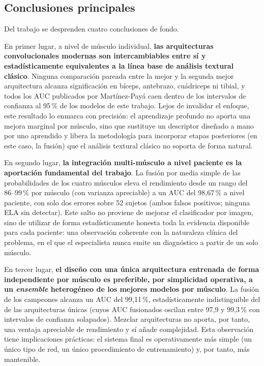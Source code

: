 \documentclass[12pt]{extarticle}
\numberwithin{equation}{section}
\begin{document}
\begin{refsection}
\subsection{Conclusiones principales}\label{subsec:conc-principales}

Del trabajo se desprenden cuatro conclusiones de fondo.

En primer lugar, a nivel de músculo individual, \textbf{las arquitecturas convolucionales modernas son intercambiables entre sí y estadísticamente equivalentes a la línea base de análisis textural clásico}. Ninguna comparación pareada entre la mejor y la segunda mejor arquitectura alcanza significación en bíceps, antebrazo, cuádriceps ni tibial, y todos los AUC publicados por Martínez-Payá caen dentro de los intervalos de confianza al 95\,\% de los modelos de este trabajo. Lejos de invalidar el enfoque, este resultado lo enmarca con precisión: el aprendizaje profundo no aporta una mejora marginal por músculo, sino que sustituye un descriptor diseñado a mano por uno aprendido y libera la metodología para incorporar etapas posteriores (en este caso, la fusión) que el análisis textural clásico no soporta de forma natural.

En segundo lugar, \textbf{la integración multi-músculo a nivel paciente es la aportación fundamental del trabajo}. La fusión por media simple de las probabilidades de los cuatro músculos eleva el rendimiento desde un rango del 86--99\,\% por músculo (con varianza apreciable) a un AUC del 98{,}67\,\% a nivel paciente, con solo dos errores sobre 52 sujetos (ambos falsos positivos; ninguna ELA sin detectar). Este salto no proviene de mejorar el clasificador por imagen, sino de utilizar de forma estadísticamente honesta toda la evidencia disponible para cada paciente: una observación coherente con la naturaleza clínica del problema, en el que el especialista nunca emite un diagnóstico a partir de un solo músculo.

En tercer lugar, \textbf{el diseño con una única arquitectura entrenada de forma independiente por músculo es preferible, por simplicidad operativa, a un \textit{ensemble} heterogéneo de los mejores modelos por músculo}. La fusión de los campeones alcanza un AUC del 99{,}11\,\%, estadísticamente indistinguible del de las arquitecturas únicas (cuyos AUC fusionados oscilan entre 97{,}9 y 99{,}3\,\% con intervalos de confianza solapados). Mezclar arquitecturas no aporta, por tanto, una ventaja apreciable de rendimiento y sí añade complejidad. Esta observación tiene implicaciones prácticas: el sistema final es operativamente más simple (un único tipo de red, un único procedimiento de entrenamiento) y, por tanto, más mantenible.


\end{refsection}
\end{document}
